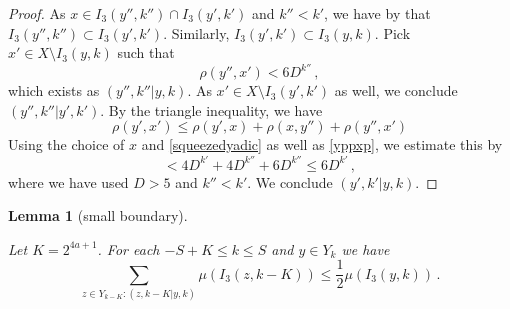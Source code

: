 \documentclass[10pt,a4paper]{article}
\theoremstyle{plain}
\newtheorem{lemma}[theorem]{Lemma}
\theoremstyle{definition}
\numberwithin{equation}{subsection}
\newcommand{\lean}[1]{}
\newcommand{\uses}[1]{}
\newcommand{\leanok}{}
\begin{document}
\begin{proof}
    \leanok
    As $x\in I_3(y'',k'')\cap I_3(y',k')$ and $k''< k'$, we have by  that
    $I_3(y'',k'')\subset I_3(y',k')$. Similarly,
    $I_3(y',k')\subset I_3(y,k)$.
    Pick $x'\in X\setminus I_3(y,k)$ such that
    \begin{equation}\label{yppxp}
        \rho(y'',x')< 6D^{k''}\, ,
    \end{equation}
    which exists as $(y'',k''|y,k)$. As
    $x'\in X\setminus I_3(y',k')$ as well, we conclude
    $(y'',k''| y',k')$.
    By the triangle inequality, we have
    \begin{equation}
    \rho(y',x')\le \rho(y',x)+\rho(x,y'')+\rho(y'',x')
    \end{equation}
    Using the choice of $x$ and \eqref{squeezedyadic}
    as well as \eqref{yppxp}, we estimate this by
    \begin{equation}
    < 4D^{k'}+4D^{k''}+6D^{k''}\le 6D^{k'}\, ,
    \end{equation}
    where we have used $D>5$ and $k''<k'$.
    We conclude $(y',k'|y,k)$.
\end{proof}


\begin{lemma}[small boundary]
    \label{small-boundary}
    \uses{transitive-boundary}
    \leanok
    \lean{small_boundary}
    Let $K = 2^{4a+1}$. For each $-S+K\le k\le S$ and $y\in Y_k$ we have
      \begin{equation}
            \label{new-small-boundary}
            \sum_{z\in Y_{k-K}: (z,k-K|y,k)}\mu(I_3(z,k-K)) \le \frac 12 \mu(I_3(y,k))\,.
        \end{equation}
\end{lemma}
\end{document}
